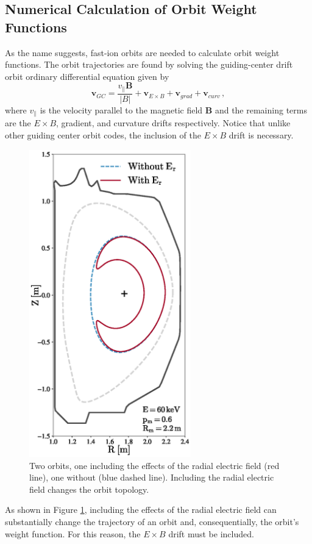 \subsection{Numerical Calculation of Orbit Weight Functions}
As the name suggests, fast-ion orbits are needed to calculate orbit weight functions. The orbit trajectories are found by solving the guiding-center drift orbit ordinary differential equation given by
\begin{equation}\label{eq:gc_ode}
    \mathbf{v}_{GC} = \frac{v_{\parallel}\mathbf{B}}{|B|} + \mathbf{v}_{E \times B} + \mathbf{v}_{grad} + \mathbf{v}_{curv}\,,
\end{equation}
where $v_{\parallel}$ is the velocity parallel to the magnetic field $\mathbf{B}$ and the remaining terms are the $E\times B$, gradient, and curvature drifts respectively. Notice that unlike other guiding center orbit codes, the inclusion of the $E \times B$ drift is necessary.
\begin{figure}[h!]
    \centering
    \includegraphics[width=7cm]{figures/orbit_er.eps}
    \caption{Two orbits, one including the effects of the radial electric field (red line), one without (blue dashed line). Including the radial electric field changes the orbit topology.}
    \label{fig:orbit_er}
\end{figure}
As shown in Figure \ref{fig:orbit_er}, including the effects of the radial electric field can substantially change the trajectory of an orbit and, consequentially, the orbit's weight function. For this reason, the $E \times B$ drift must be included.

